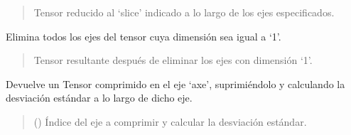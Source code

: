 \documentclass[letterpaper,10pt,english]{sphinxmanual}
\begin{document}
\begin{fulllineitems}
\begin{fulllineitems}
\begin{quote}
\begin{description}
\sphinxAtStartPar
Tensor reducido al ‘slice’ indicado a lo largo de los ejes especificados.

\sphinxAtStartPar
{\hyperref[\detokenize{utils.tensor:utils.tensor.Tensor}]{}}

\end{description}\end{quote}

\end{fulllineitems}


\begin{fulllineitems}
\label{\detokenize{utils.tensor:utils.tensor.Tensor.squeeze}}
\pysigstartsignatures
{}
\pysigstopsignatures
\sphinxAtStartPar
Elimina todos los ejes del tensor cuya dimensión sea igual a ‘1’.
\begin{quote}\begin{description}
\sphinxAtStartPar
Tensor resultante después de eliminar los ejes con dimensión ‘1’.

\sphinxAtStartPar
{\hyperref[\detokenize{utils.tensor:utils.tensor.Tensor}]{}}

\end{description}\end{quote}

\end{fulllineitems}


\begin{fulllineitems}
\label{\detokenize{utils.tensor:utils.tensor.Tensor.std}}
\pysigstartsignatures
{}
\pysigstopsignatures
\sphinxAtStartPar
Devuelve un Tensor comprimido en el eje ‘axe’, suprimiéndolo y calculando la desviación estándar a lo largo de dicho eje.
\begin{quote}\begin{description}
\sphinxAtStartPar
{} () \textendash{} Índice del eje a comprimir y calcular la desviación estándar.


\end{description}
\end{quote}
\end{fulllineitems}
\end{fulllineitems}
\end{document}
